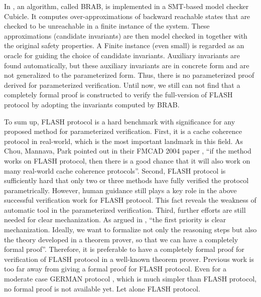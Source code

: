 \documentclass{llncs}
\newcommand{\bedt}[1]{{\color{black}#1}}
\begin{document}
\bedt{In \cite{cubeicBeyond}, an algorithm, called BRAB, is implemented in a SMT-based model checker Cubicle.  It} computes over-approximations of
backward reachable states that are checked to be unreachable in
a finite instance of the system. These approximations (candidate
invariants) are then model checked in together with the original
safety properties. A Finite instance (even small) is regarded as
an oracle for guiding the choice of candidate
invariants. Auxiliary invariants are found automatically, but these auxiliary invariants are in concrete form and are not generalized to the parameterized form. Thus, there is no  parameterized proof derived for parameterized verification. Until now, we still can not find that a completely formal proof is constructed to verify the full-version of FLASH protocol by adopting the invariants computed by BRAB. %

To sum up,  FLASH protocol is a hard  benchmark with significance for any proposed method for parameterized verification. First, it is a cache coherence protocol in real-world, which is  the most important landmark in this field.  As Chou, Mannava, Park pointed out in their FMCAD 2004 paper \cite{Chou2004}, ``if the method works on FLASH protocol, then there is a good chance that it will also work on many real-world cache coherence protocols''. Second,
FLASH protocol is  sufficiently hard that only two or three methods have  fully verified
the protocol parametrically. However, human guidance still plays a key role in the above successful verification work for FLASH protocol. This fact reveals  the weakness of automatic tool in the parameterized verification.  Third, further  efforts are still needed for clear mechanization. As argued in \cite{Chou2004}, ``the first priority is clear mechanization. Ideally, we want to formalize not only the reasoning
steps  but also the theory developed in a theorem
prover, so that we can have a completely formal proof''. Therefore, it is preferable to  have a completely formal proof for verification of FLASH protocol in a well-known theorem prover. Previous work is too far away from giving a formal proof for FLASH protocol. Even for a moderate case GERMAN protocol \cite{Arons2001}, which is much simpler than FLASH protocol, no formal proof is not available yet. Let alone FLASH protocol.
\end{document}
